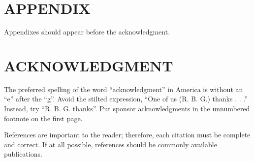 \documentclass[letterpaper, 10 pt, conference]{ieeeconf}  %
\begin{document}
\section*{APPENDIX}

Appendixes should appear before the acknowledgment.

\section*{ACKNOWLEDGMENT}

The preferred spelling of the word “acknowledgment” in America is without an “e” after the “g”. Avoid the stilted expression, “One of us (R. B. G.) thanks . . .”  Instead, try “R. B. G. thanks”. Put sponsor acknowledgments in the unnumbered footnote on the first page.




References are important to the reader; therefore, each citation must be complete and correct. If at all possible, references should be commonly available publications.
\end{document}
